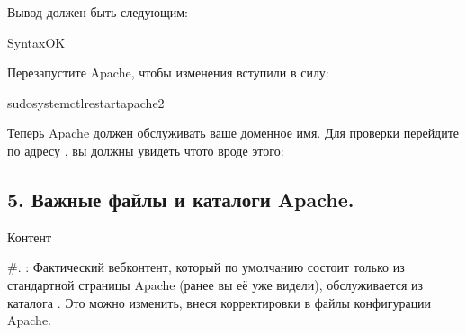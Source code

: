 \documentclass[a4paper,10pt,russian]{report}
\begin{document}
\sphinxAtStartPar
Вывод должен быть следующим:

\begin{sphinxVerbatim}[commandchars=\\\{\}]
\PYGZdl{}SyntaxOK
\end{sphinxVerbatim}

\sphinxAtStartPar
Перезапустите Apache, чтобы изменения вступили в силу:

\begin{sphinxVerbatim}[commandchars=\\\{\}]
\PYGZdl{}sudosystemctlrestartapache2
\end{sphinxVerbatim}

\sphinxAtStartPar
Теперь Apache должен обслуживать ваше доменное имя. Для проверки перейдите по адресу , вы должны увидеть что\sphinxhyphen{}то вроде этого:


\subsection{5. Важные файлы и каталоги Apache.}
\label{\detokenize{docs:id7}}
\sphinxAtStartPar
Контент

\sphinxAtStartPar
\#. : Фактический веб\sphinxhyphen{}контент, который по умолчанию состоит только из стандартной
страницы Apache (ранее вы её уже видели), обслуживается из каталога . Это можно изменить,
внеся корректировки в файлы конфигурации Apache.
\end{document}

